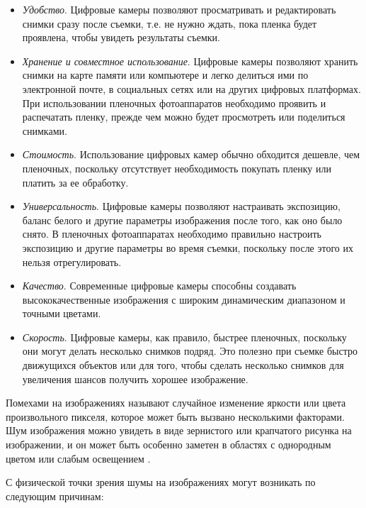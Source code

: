 \begin{itemize}
    \item \textit{Удобство}. Цифровые камеры позволяют просматривать и редактировать снимки сразу после съемки, т.е. не нужно ждать, пока пленка будет проявлена, чтобы увидеть результаты съемки.
    \item \textit{Хранение и совместное использование}. Цифровые камеры позволяют хранить снимки на карте памяти или компьютере и легко делиться ими по электронной почте, в социальных сетях или на других цифровых платформах. При использовании пленочных фотоаппаратов необходимо проявить и распечатать пленку, прежде чем можно будет просмотреть или поделиться снимками.
    \item \textit{Стоимость}. Использование цифровых камер обычно обходится дешевле, чем пленочных, поскольку отсутствует необходимость покупать пленку или платить за ее обработку.
    \item \textit{Универсальность}. Цифровые камеры позволяют настраивать экспозицию, баланс белого и другие параметры изображения после того, как оно было снято. В пленочных фотоаппаратах необходимо правильно настроить экспозицию и другие параметры во время съемки, поскольку после этого их нельзя отрегулировать.
    \item \textit{Качество}. Современные цифровые камеры способны создавать высококачественные изображения с широким динамическим диапазоном и точными цветами.
    \item \textit{Скорость}. Цифровые камеры, как правило, быстрее пленочных, поскольку они могут делать несколько снимков подряд. Это полезно при съемке быстро движущихся объектов или для того, чтобы сделать несколько снимков для увеличения шансов получить хорошее изображение.
\end{itemize}

Помехами на изображениях называют случайное изменение яркости или цвета произвольного пикселя, которое может быть вызвано несколькими факторами. Шум изображения можно увидеть в виде зернистого или крапчатого рисунка на изображении, и он может быть особенно заметен в областях с однородным цветом или слабым освещением \cite{basicnoise}.

С физической точки зрения шумы на изображениях могут возникать по следующим причинам\cite{noisephysics}:

